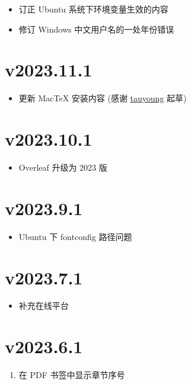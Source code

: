 \begin{itemize}
  \item 订正 Ubuntu 系统下环境变量生效的内容
  \item 修订 Windows 中文用户名的一处年份错误
\end{itemize}

\section*{v2023.11.1}

\begin{itemize}
  \item 更新 MacTeX 安装内容 (感谢 \href{https://github.com/tauyoungsama}{tauyoung} 起草)
\end{itemize}

\section*{v2023.10.1}

\begin{itemize}
  \item Overleaf 升级为 2023 版
\end{itemize}

\section*{v2023.9.1}

\begin{itemize}
  \item Ubuntu 下 fontconfig 路径问题
\end{itemize}

\section*{v2023.7.1}

\begin{itemize}
  \item 补充在线平台
\end{itemize}

\section*{v2023.6.1}

\begin{enumerate}
  \item 在 PDF 书签中显示章节序号
\end{enumerate}

